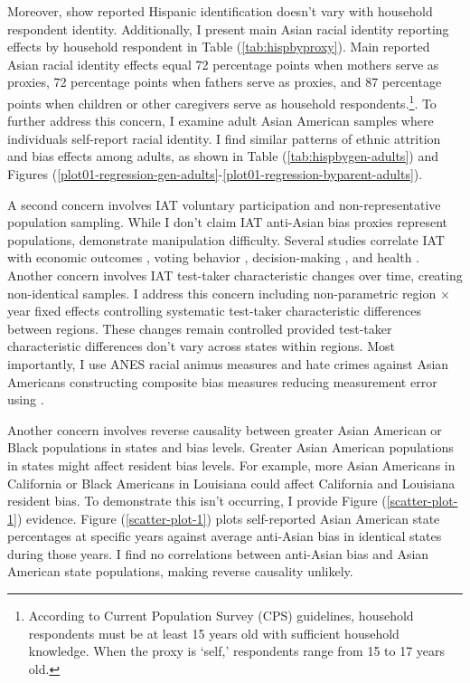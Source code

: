Moreover, \textcite{duncanIntermarriageIntergenerationalTransmission2011} show reported Hispanic identification doesn't vary with household respondent identity. Additionally, I present main Asian racial identity reporting effects by household respondent in Table (\ref{tab:hispbyproxy}). Main reported Asian racial identity effects equal 72 percentage points when mothers serve as proxies, 72 percentage points when fathers serve as proxies, and 87 percentage points when children or other caregivers serve as household respondents.\footnote{According to Current Population Survey (CPS) guidelines, household respondents must be at least 15 years old with sufficient household knowledge. When the proxy is `self,' respondents range from 15 to 17 years old.}. To further address this concern, I examine adult Asian American samples where individuals self-report racial identity. I find similar patterns of ethnic attrition and bias effects among adults, as shown in Table (\ref{tab:hispbygen-adults}) and Figures (\ref{plot01-regression-gen-adults}-\ref{plot01-regression-byparent-adults}).

A second concern involves IAT voluntary participation and non-representative population sampling. While I don't claim IAT anti-Asian bias proxies represent populations, \textcite{egloffPredictiveValidityImplicit2002} demonstrate manipulation difficulty. Several studies correlate IAT with economic outcomes \autocite{chettyRaceEconomicOpportunity2020,gloverDiscriminationSelfFulfillingProphecy2017}, voting behavior \autocite{friesePredictingVotingBehavior2007}, decision-making \autocite{bertrandImplicitDiscrimination2005,carlanaImplicitStereotypesEvidence2019}, and health \autocite{leitnerRacialBiasAssociated2016}. Another concern involves IAT test-taker characteristic changes over time, creating non-identical samples. I address this concern including non-parametric region $\times$ year fixed effects controlling systematic test-taker characteristic differences between regions. These changes remain controlled provided test-taker characteristic differences don't vary across states within regions. Most importantly, I use ANES racial animus measures and hate crimes against Asian Americans constructing composite bias measures reducing measurement error using \textcite{lubotskyInterpretationRegressionsMultiple2006}.

Another concern involves reverse causality between greater Asian American or Black populations in states and bias levels. Greater Asian American populations in states might affect resident bias levels. For example, more Asian Americans in California or Black Americans in Louisiana could affect California and Louisiana resident bias. To demonstrate this isn't occurring, I provide Figure (\ref{scatter-plot-1}) evidence. Figure (\ref{scatter-plot-1}) plots self-reported Asian American state percentages at specific years against average anti-Asian bias in identical states during those years. I find no correlations between anti-Asian bias and Asian American state populations, making reverse causality unlikely.

